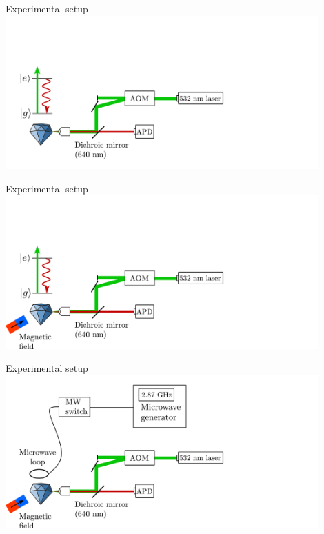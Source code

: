 \documentclass{beamer}
\begin{document}
\begin{frame}{Experimental setup}
\centering
\includegraphics[width=0.9\textwidth,height=0.85\textheight,keepaspectratio]{Slide_setup_-3}
\end{frame}

\begin{frame}{Experimental setup}
\centering
\includegraphics[width=0.9\textwidth,height=0.85\textheight,keepaspectratio]{Slide_setup_-2}
\end{frame}

\begin{frame}{Experimental setup}
\centering
\includegraphics[width=0.9\textwidth,height=0.85\textheight,keepaspectratio]{Slide_setup_-1}
\end{frame}
\end{document}
